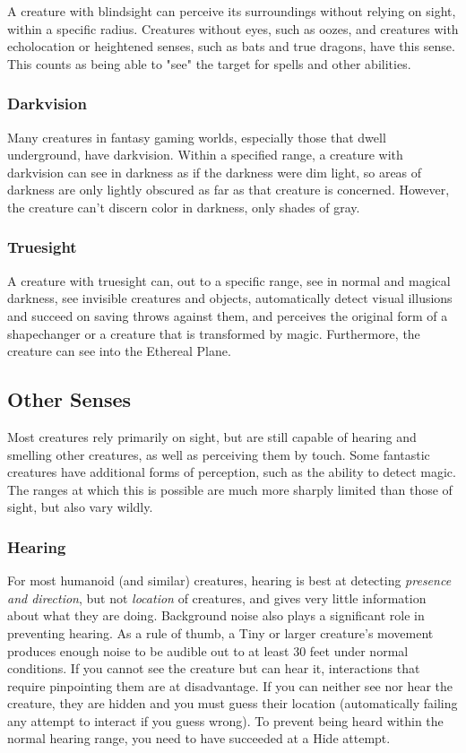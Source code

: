 A creature with blindsight can perceive its surroundings without relying on sight, within a specific radius. Creatures without eyes, such as oozes, and creatures with echolocation or heightened senses, such as bats and true dragons, have this sense. This counts as being able to "see" the target for spells and other abilities.

\subsubsection{Darkvision}

Many creatures in fantasy gaming worlds, especially those that dwell underground, have darkvision. Within a specified range, a creature with darkvision can see in darkness as if the darkness were dim light, so areas of darkness are only lightly obscured as far as that creature is concerned. However, the creature can't discern color in darkness, only shades of gray.

\subsubsection{Truesight}

A creature with truesight can, out to a specific range, see in normal and magical darkness, see invisible creatures and objects, automatically detect visual illusions and succeed on saving throws against them, and perceives the original form of a shapechanger or a creature that is transformed by magic. Furthermore, the creature can see into the Ethereal Plane.

\subsection{Other Senses}
Most creatures rely primarily on sight, but are still capable of hearing and smelling other creatures, as well as perceiving them by touch. Some fantastic creatures have additional forms of perception, such as the ability to detect magic. The ranges at which this is possible are much more sharply limited than those of sight, but also vary wildly.

\subsubsection{Hearing}
For most humanoid (and similar) creatures, hearing is best at detecting \textit{presence and direction}, but not \textit{location} of creatures, and gives very little information about what they are doing. Background noise also plays a significant role in preventing hearing. As a rule of thumb, a Tiny or larger creature's movement produces enough noise to be audible out to at least 30 feet under normal conditions. If you cannot see the creature but can hear it, interactions that require pinpointing them are at disadvantage. If you can neither see nor hear the creature, they are hidden and you must guess their location (automatically failing any attempt to interact if you guess wrong). To prevent being heard within the normal hearing range, you need to have succeeded at a Hide attempt. 


